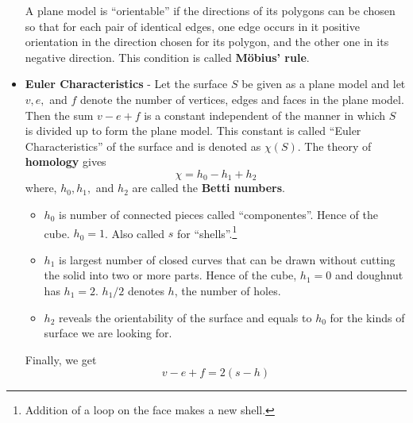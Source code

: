 \documentclass[12pt,a4paper,openbib]{article}
\begin{document}
\begin{itemize}
		A plane model is ``orientable'' if the directions of its polygons can 
		be chosen so that for each pair of identical edges, one edge occurs in
		it positive orientation in the direction chosen for its polygon, and
		the other one in its negative direction. This condition is called
		{\bf M\"{o}bius' rule}.	
	\item {\bf Euler Characteristics} - Let the surface $S$ be given as a plane
		model and let $v,e,$ and $f$ denote the number of vertices, edges and
		faces in the plane model. Then the sum $ v - e + f$ is a constant
		independent of the manner in which $S$ is divided up to form the plane
		model. This constant is called ``Euler Characteristics'' of the
		surface and is denoted as $\chi(S)$. The theory of {\bf homology} gives
		\begin{equation}
			\chi = h_{0} - h_{1} + h_{2}
		\end{equation}
		where, $h_{0},h_{1},$ and $h_{2}$ are called the {\bf Betti numbers}.
		\begin{itemize}
			\item $h_{0}$ is number of connected pieces called ``componentes''.
					Hence of the cube. $h_{0} = 1$. Also called $s$ for 
					``shells''.\footnote{Addition of a loop on the face makes
					a new shell.}
			\item $h_{1}$ is largest number of closed curves that can be drawn
					without cutting the solid into two or more parts.
					Hence of the cube, $h_{1} = 0$ and doughnut has $h_{1} = 2$.
					$h_{1}/2$ denotes $h$, the number of holes.
			\item $h_{2}$ reveals the orientability of the surface and equals
					to $h_{0}$ for the kinds of surface we are looking for.
		\end{itemize}
		Finally, we get
		\begin{equation}
		 	v -e +f = 2(s -h)
		\end{equation}


\end{itemize}
\end{document}
